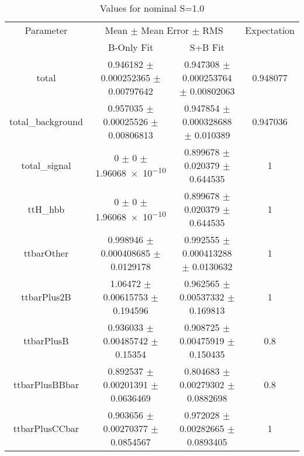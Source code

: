 \begin{table}
\centering
\caption{Values for nominal S=1.0}
\begin{tabular}{cccc}
\toprule
Parameter & \multicolumn{2}{c}{Mean $\pm$ Mean Error $\pm$ RMS} & Expectation\\
 & B-Only Fit & S+B Fit & \\
\midrule
total & \num{0.946182} $\pm$ \num{0.000252365} $\pm$ \num{0.00797642} & \num{0.947308} $\pm$ \num{0.000253764} $\pm$ \num{0.00802063} & \num{0.948077}\\
total\_background & \num{0.957035} $\pm$ \num{0.00025526} $\pm$ \num{0.00806813} & \num{0.947854} $\pm$ \num{0.000328688} $\pm$ \num{0.010389} & \num{0.947036}\\
total\_signal & \num{0} $\pm$ \num{0} $\pm$ \num{1.96068e-10} & \num{0.899678} $\pm$ \num{0.020379} $\pm$ \num{0.644535} & \num{1}\\
ttH\_hbb & \num{0} $\pm$ \num{0} $\pm$ \num{1.96068e-10} & \num{0.899678} $\pm$ \num{0.020379} $\pm$ \num{0.644535} & \num{1}\\
ttbarOther & \num{0.998946} $\pm$ \num{0.000408685} $\pm$ \num{0.0129178} & \num{0.992555} $\pm$ \num{0.000413288} $\pm$ \num{0.0130632} & \num{1}\\
ttbarPlus2B & \num{1.06472} $\pm$ \num{0.00615753} $\pm$ \num{0.194596} & \num{0.962565} $\pm$ \num{0.00537332} $\pm$ \num{0.169813} & \num{1}\\
ttbarPlusB & \num{0.936033} $\pm$ \num{0.00485742} $\pm$ \num{0.15354} & \num{0.908725} $\pm$ \num{0.00475919} $\pm$ \num{0.150435} & \num{0.8}\\
ttbarPlusBBbar & \num{0.892537} $\pm$ \num{0.00201391} $\pm$ \num{0.0636469} & \num{0.804683} $\pm$ \num{0.00279302} $\pm$ \num{0.0882698} & \num{0.8}\\
ttbarPlusCCbar & \num{0.903656} $\pm$ \num{0.00270377} $\pm$ \num{0.0854567} & \num{0.972028} $\pm$ \num{0.00282665} $\pm$ \num{0.0893405} & \num{1}\\
\bottomrule
\end{tabular}
\end{table}
